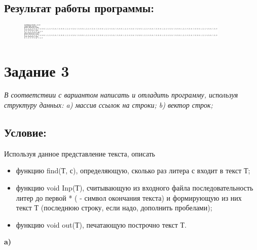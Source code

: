 \documentclass[14pt,a4paper]{article}
\begin{document}
\subsection{Результат работы программы:}
\begin{figure}[H]
  \includegraphics[width=0.9\textwidth]{data/demo18_2.png}
\end{figure}
\section*{Задание 3}
\textsl{В соответствии с вариантом написать и отладить программу, используя структуру данных: a) массив ссылок на строки; b) вектор строк;}\\
\setcounter{subsection}{0}
\subsection{Условие:}
Используя данное представление текста, описать
\begin{itemize}
  \item функцию find(Т, с), определяющую, сколько раз литера с входит в текст Т;
  \item функцию void  Inp(Т), считывающую из входного файла последовательность
    литер до первой * ( - символ окончания текста) и формирующую из них текст Т
    (последнюю строку, если надо, дополнить пробелами);
  \item функцию void  out(Т), печатающую построчно текст Т.
\end{itemize}
{\large\textbf{a)}}
\end{document}
